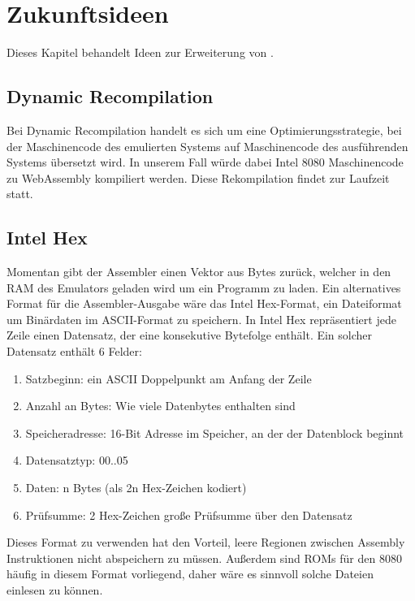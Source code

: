 \chapter{Zukunftsideen}

Dieses Kapitel behandelt Ideen zur Erweiterung von \Emu.

\section{Dynamic Recompilation}

Bei Dynamic Recompilation handelt es sich um eine Optimierungsstrategie, bei der Maschinencode des emulierten Systems auf Maschinencode des ausführenden Systems übersetzt wird. In unserem Fall würde dabei Intel 8080 Maschinencode zu WebAssembly kompiliert werden. Diese Rekompilation findet zur Laufzeit statt.


\section{Intel Hex}

Momentan gibt der Assembler einen Vektor aus Bytes zurück, welcher in den RAM des Emulators geladen wird um ein Programm zu laden. Ein alternatives Format für die Assembler-Ausgabe wäre das Intel Hex-Format, ein Dateiformat um Binärdaten im ASCII-Format zu speichern. In Intel Hex repräsentiert jede Zeile einen Datensatz, der eine konsekutive Bytefolge enthält. Ein solcher Datensatz enthält 6 Felder:

\begin{enumerate}
\item Satzbeginn: ein ASCII Doppelpunkt am Anfang der Zeile
\item Anzahl an Bytes: Wie viele Datenbytes enthalten sind
\item Speicheradresse: 16-Bit Adresse im Speicher, an der der Datenblock beginnt
\item Datensatztyp: 00..05
\item Daten: n Bytes (als 2n Hex-Zeichen kodiert)
\item Prüfsumme: 2 Hex-Zeichen große Prüfsumme über den Datensatz
\end{enumerate}

Dieses Format zu verwenden hat den Vorteil, leere Regionen zwischen Assembly Instruktionen nicht abspeichern zu müssen. Außerdem sind ROMs für den 8080 häufig in diesem Format vorliegend, daher wäre es sinnvoll solche Dateien einlesen zu können.
